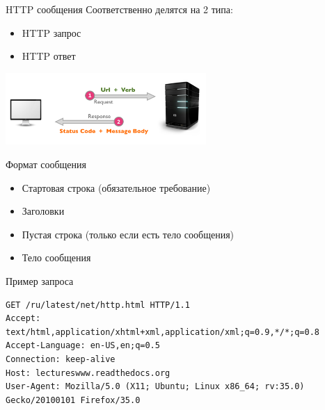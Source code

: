 \documentclass[c,unicode,russian]{beamer}
\begin{document}
\begin{frame}{HTTP сообщения}
 Соответственно делятся на 2 типа:
 \begin{itemize}
     \item HTTP запрос
     \item HTTP ответ
 \end{itemize}
 \begin{center}
     \includegraphics[width=3in]{media/client-server-details.png}
 \end{center}
\end{frame}

\begin{frame}{Формат сообщения}
 \begin{itemize}
     \item Стартовая строка (обязательное требование)
     \item Заголовки
     \item Пустая строка (только если есть тело сообщения)
     \item Тело сообщения
 \end{itemize}
\end{frame}

\begin{frame}[fragile]{Пример запроса}
    \begin{Verbatim}[fontsize=\scriptsize]
GET /ru/latest/net/http.html HTTP/1.1
Accept: text/html,application/xhtml+xml,application/xml;q=0.9,*/*;q=0.8
Accept-Language: en-US,en;q=0.5
Connection: keep-alive
Host: lectureswww.readthedocs.org
User-Agent: Mozilla/5.0 (X11; Ubuntu; Linux x86_64; rv:35.0) Gecko/20100101 Firefox/35.0
    \end{Verbatim}
\end{frame}
\end{document}
